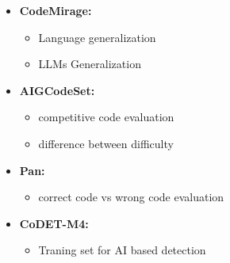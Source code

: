 \begin{itemize}
    \item \textbf{CodeMirage:}
    \begin{itemize}
        \item Language generalization
        \item LLMs Generalization
    \end{itemize}

    \item \textbf{AIGCodeSet:}
    \begin{itemize}
        \item competitive code evaluation
        \item difference between difficulty
    \end{itemize}

    \item \textbf{Pan:}
    \begin{itemize}
        \item correct code vs wrong code evaluation
    \end{itemize}

    \item \textbf{CoDET-M4:}
    \begin{itemize}
        \item Traning set for AI based detection
    \end{itemize}
\end{itemize}



